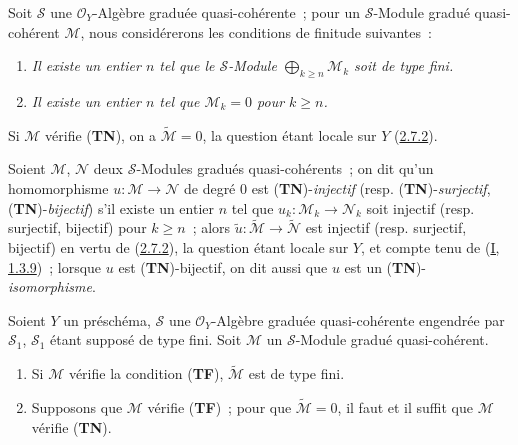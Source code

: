 \begin{env}[3.4.2]
\label{II.3.4.2-fr}
Soit $\mathcal{S}$ une $\mathcal{O}_Y$-Algèbre graduée quasi-cohérente~; pour
un $\mathcal{S}$-Module gradué quasi-cohérent $\mathcal{M}$, nous considérerons
les conditions de finitude suivantes~:
\begin{enumerate}
  \item[(\textbf{TF})] \emph{Il existe un entier $n$ tel que le
    $\mathcal{S}$-Module $\bigoplus_{k\geq n}\mathcal{M}_k$ soit de type fini.}
  \item[(\textbf{TN})] \emph{Il existe un entier $n$ tel que
    $\mathcal{M}_k=0$ pour $k\geq n$.}
\end{enumerate}
Si $\mathcal{M}$ vérifie (\textbf{TN}), on a
$\widetilde{\mathcal{M}}=0$, la question étant locale sur $Y$
(\hyperref[II.2.7.2-fr]{2.7.2}).

Soient $\mathcal{M}$, $\mathcal{N}$ deux $\mathcal{S}$-Modules gradués
quasi-cohérents~; on dit qu'un homomorphisme
$u:\mathcal{M}\to\mathcal{N}$ de degré $0$ est
(\textbf{TN})-\emph{injectif} (resp. (\textbf{TN})-\emph{surjectif},
(\textbf{TN})-\emph{bijectif}) s'il existe un entier $n$ tel que
$u_k:\mathcal{M}_k\to\mathcal{N}_k$ soit injectif (resp. surjectif, bijectif)
pour $k\geq n$~; alors
$\widetilde{u}:\widetilde{\mathcal{M}}\to\widetilde{\mathcal{N}}$ est injectif
(resp. surjectif, bijectif) en vertu de
(\hyperref[II.2.7.2-fr]{2.7.2}), la question étant locale sur $Y$, et compte
tenu de (\hyperref[I.1.3.9-fr]{I, 1.3.9})~; lorsque $u$ est
(\textbf{TN})-bijectif, on dit aussi que $u$ est un
(\textbf{TN})-\emph{isomorphisme}.
\end{env}

\begin{proposition}[3.4.3]
\label{II.3.4.3-fr}
Soient $Y$ un préschéma, $\mathcal{S}$ une $\mathcal{O}_Y$-Algèbre graduée
quasi-cohérente engendrée par $\mathcal{S}_1$, $\mathcal{S}_1$ étant supposé
de type fini. Soit $\mathcal{M}$ un $\mathcal{S}$-Module gradué
quasi-cohérent.
\begin{enumerate}
  \item[\rm(i)] Si $\mathcal{M}$ vérifie la condition (\textbf{TF}),
    $\widetilde{\mathcal{M}}$ est de type fini.
  \item[\rm(ii)] Supposons que $\mathcal{M}$ vérifie (\textbf{TF})~; pour que
    $\widetilde{\mathcal{M}}=0$, il faut et il suffit que $\mathcal{M}$
    vérifie (\textbf{TN}).
\end{enumerate}
\end{proposition}

